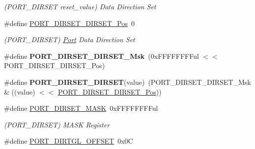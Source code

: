 \begin{DoxyCompactItemize}
\begin{DoxyCompactList}\small\item\em (P\+O\+R\+T\+\_\+\+D\+I\+R\+S\+E\+T reset\+\_\+value) Data Direction Set \end{DoxyCompactList}\item 
\hypertarget{group___s_a_m_l21___p_o_r_t_gaa2c0a845406e6ca4e31556d413108aeb}{}\#define \hyperlink{group___s_a_m_l21___p_o_r_t_gaa2c0a845406e6ca4e31556d413108aeb}{P\+O\+R\+T\+\_\+\+D\+I\+R\+S\+E\+T\+\_\+\+D\+I\+R\+S\+E\+T\+\_\+\+Pos}~0\label{group___s_a_m_l21___p_o_r_t_gaa2c0a845406e6ca4e31556d413108aeb}

\begin{DoxyCompactList}\small\item\em (P\+O\+R\+T\+\_\+\+D\+I\+R\+S\+E\+T) \hyperlink{struct_port}{Port} Data Direction Set \end{DoxyCompactList}\item 
\hypertarget{group___s_a_m_l21___p_o_r_t_ga0b4a8e93964c1bedc8f48b0fa037e500}{}\#define {\bfseries P\+O\+R\+T\+\_\+\+D\+I\+R\+S\+E\+T\+\_\+\+D\+I\+R\+S\+E\+T\+\_\+\+Msk}~(0x\+F\+F\+F\+F\+F\+F\+F\+Ful $<$$<$ P\+O\+R\+T\+\_\+\+D\+I\+R\+S\+E\+T\+\_\+\+D\+I\+R\+S\+E\+T\+\_\+\+Pos)\label{group___s_a_m_l21___p_o_r_t_ga0b4a8e93964c1bedc8f48b0fa037e500}

\item 
\hypertarget{group___s_a_m_l21___p_o_r_t_ga75a539d2c42e4d5058181a8700b8e9c0}{}\#define {\bfseries P\+O\+R\+T\+\_\+\+D\+I\+R\+S\+E\+T\+\_\+\+D\+I\+R\+S\+E\+T}(value)~(P\+O\+R\+T\+\_\+\+D\+I\+R\+S\+E\+T\+\_\+\+D\+I\+R\+S\+E\+T\+\_\+\+Msk \& ((value) $<$$<$ \hyperlink{group___s_a_m_l21___p_o_r_t_gaa2c0a845406e6ca4e31556d413108aeb}{P\+O\+R\+T\+\_\+\+D\+I\+R\+S\+E\+T\+\_\+\+D\+I\+R\+S\+E\+T\+\_\+\+Pos}))\label{group___s_a_m_l21___p_o_r_t_ga75a539d2c42e4d5058181a8700b8e9c0}

\item 
\hypertarget{group___s_a_m_l21___p_o_r_t_gab1abf1381a08ea14af8f13dc141993e4}{}\#define \hyperlink{group___s_a_m_l21___p_o_r_t_gab1abf1381a08ea14af8f13dc141993e4}{P\+O\+R\+T\+\_\+\+D\+I\+R\+S\+E\+T\+\_\+\+M\+A\+S\+K}~0x\+F\+F\+F\+F\+F\+F\+F\+Ful\label{group___s_a_m_l21___p_o_r_t_gab1abf1381a08ea14af8f13dc141993e4}

\begin{DoxyCompactList}\small\item\em (P\+O\+R\+T\+\_\+\+D\+I\+R\+S\+E\+T) M\+A\+S\+K Register \end{DoxyCompactList}\item 
\hypertarget{group___s_a_m_l21___p_o_r_t_ga527f45d84e80e23f0545616308328337}{}\#define \hyperlink{group___s_a_m_l21___p_o_r_t_ga527f45d84e80e23f0545616308328337}{P\+O\+R\+T\+\_\+\+D\+I\+R\+T\+G\+L\+\_\+\+O\+F\+F\+S\+E\+T}~0x0\+C\label{group___s_a_m_l21___p_o_r_t_ga527f45d84e80e23f0545616308328337}


\end{DoxyCompactItemize}
